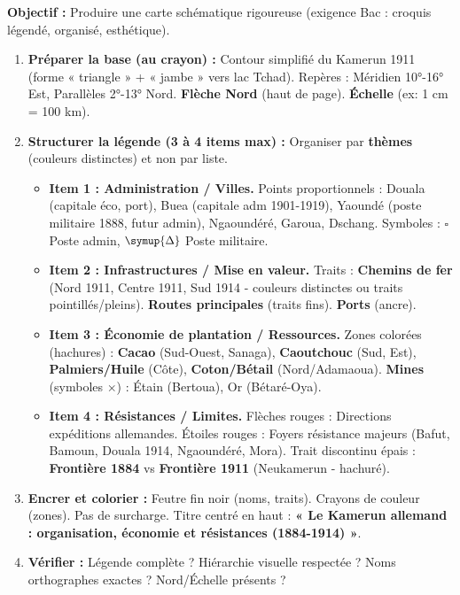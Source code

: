 \documentclass[11pt]{article}
\def\triangle{\mathord{\scalebox{0.9}{$\symup{\Delta}$}}}%
\begin{document}
\begin{methode}
\textbf{Objectif :} Produire une carte schématique rigoureuse (exigence Bac : croquis légendé, organisé, esthétique).
\begin{enumerate}
    \item \textbf{Préparer la base (au crayon) :} Contour simplifié du Kamerun 1911 (forme « triangle » + « jambe » vers lac Tchad). Repères : Méridien 10°-16° Est, Parallèles 2°-13° Nord. \textbf{Flèche Nord} (haut de page). \textbf{Échelle} (ex: 1 cm = 100 km).
    \item \textbf{Structurer la légende (3 à 4 items max) :} Organiser par \textbf{thèmes} (couleurs distinctes) et non par liste.
    \begin{itemize}
        \item \textbf{Item 1 : Administration / Villes.} Points proportionnels : Douala (capitale éco, port), Buea (capitale adm 1901-1919), Yaoundé (poste militaire 1888, futur admin), Ngaoundéré, Garoua, Dschang. Symboles : $\square$ Poste admin, $\triangle$ Poste militaire.
        \item \textbf{Item 2 : Infrastructures / Mise en valeur.} Traits : \textbf{Chemins de fer} (Nord 1911, Centre 1911, Sud 1914 - couleurs distinctes ou traits pointillés/pleins). \textbf{Routes principales} (traits fins). \textbf{Ports} (ancre).
        \item \textbf{Item 3 : Économie de plantation / Ressources.} Zones colorées (hachures) : \textbf{Cacao} (Sud-Ouest, Sanaga), \textbf{Caoutchouc} (Sud, Est), \textbf{Palmiers/Huile} (Côte), \textbf{Coton/Bétail} (Nord/Adamaoua). \textbf{Mines} (symboles $\times$) : Étain (Bertoua), Or (Bétaré-Oya).
        \item \textbf{Item 4 : Résistances / Limites.} Flèches rouges : Directions expéditions allemandes. Étoiles rouges : Foyers résistance majeurs (Bafut, Bamoun, Douala 1914, Ngaoundéré, Mora). Trait discontinu épais : \textbf{Frontière 1884} vs \textbf{Frontière 1911} (Neukamerun - hachuré).
    \end{itemize}
    \item \textbf{Encrer et colorier :} Feutre fin noir (noms, traits). Crayons de couleur (zones). Pas de surcharge. Titre centré en haut : \textbf{« Le Kamerun allemand : organisation, économie et résistances (1884-1914) »}.
    \item \textbf{Vérifier :} Légende complète ? Hiérarchie visuelle respectée ? Noms orthographes exactes ? Nord/Échelle présents ?
\end{enumerate}
\end{methode}
\end{document}
